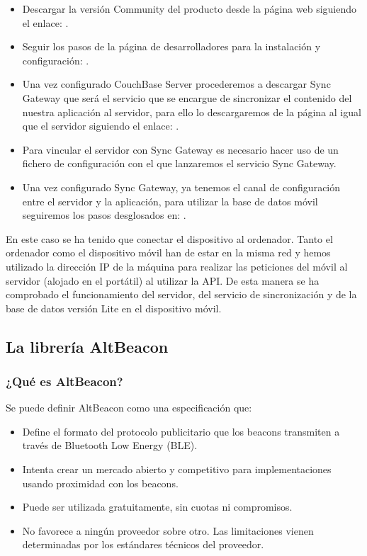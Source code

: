 \begin{itemize}
\item Descargar la versión Community del producto desde la página web siguiendo el enlace: \cite{URL::couchbaseDownload}. 
\item Seguir los pasos de la página de desarrolladores para la instalación y configuración: \cite{URL::couchBaseGuide}. 
\item Una vez configurado CouchBase Server procederemos a descargar Sync Gateway que será el servicio que se encargue de sincronizar el contenido del nuestra aplicación al servidor, para ello lo descargaremos de la página al igual que el servidor siguiendo el enlace: \cite{URL::couchbaseDownload} .
\item Para vincular el servidor con Sync Gateway es necesario hacer uso de un fichero de configuración con el que lanzaremos el servicio Sync Gateway.
\item Una vez configurado Sync Gateway, ya tenemos el canal de configuración entre el servidor y la aplicación, para utilizar la base de datos móvil seguiremos los pasos desglosados en: \cite{URL::couchBaseLite} .
\end{itemize}


En este caso se ha tenido que conectar el dispositivo al ordenador. Tanto el ordenador como el dispositivo móvil han de estar en la misma red y hemos utilizado la dirección IP de la máquina para realizar las peticiones del móvil al servidor (alojado en el portátil) al utilizar la API. De esta manera se ha comprobado el funcionamiento del servidor, del servicio de sincronización y de la base de datos versión Lite en el dispositivo móvil.


\subsection{La librería AltBeacon}


\subsubsection{¿Qué es AltBeacon?}

Se puede definir AltBeacon como una especificación que: 

\begin{itemize}
\item Define el formato del protocolo publicitario que los beacons transmiten a través de Bluetooth Low Energy (BLE).
\item Intenta crear un mercado abierto y competitivo para implementaciones usando proximidad con los beacons.
\item Puede ser utilizada gratuitamente, sin cuotas ni compromisos.
\item No favorece a ningún proveedor sobre otro. Las limitaciones vienen determinadas por los estándares técnicos del proveedor.
\end{itemize}

